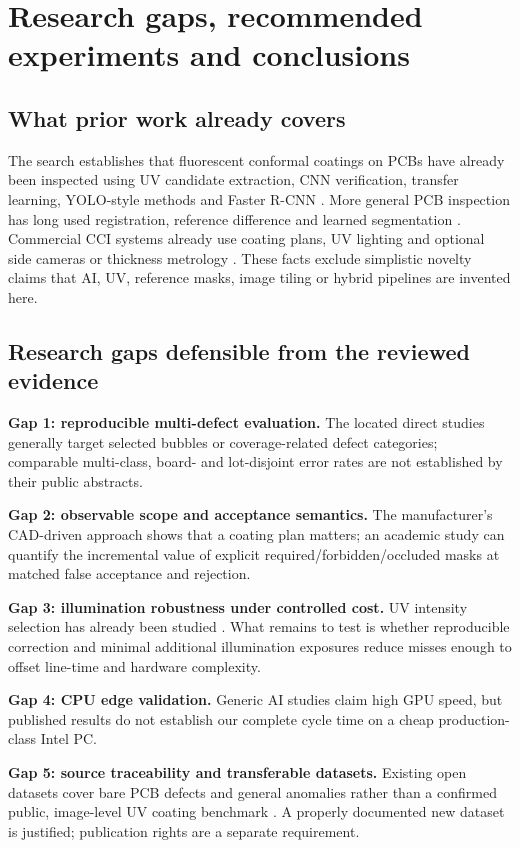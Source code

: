 \section{Research gaps, recommended experiments and conclusions}
\subsection{What prior work already covers}
The search establishes that fluorescent conformal coatings on PCBs have already been inspected using UV candidate extraction, CNN verification, transfer learning, YOLO-style methods and Faster R-CNN \citep{lee2021cnn,lee2021transfer,choi2024uv,wang2025bubble,patel2026coverage}. More general PCB inspection has long used registration, reference difference and learned segmentation \citep{hara1988fluorescent,qub2025registration,ebayyeh2020aoi}. Commercial CCI systems already use coating plans, UV lighting and optional side cameras or thickness metrology \citep{goepelcci,nordsoncci,mirteccci}. These facts exclude simplistic novelty claims that AI, UV, reference masks, image tiling or hybrid pipelines are invented here.

\subsection{Research gaps defensible from the reviewed evidence}
\textbf{Gap 1: reproducible multi-defect evaluation.} The located direct studies generally target selected bubbles or coverage-related defect categories; comparable multi-class, board- and lot-disjoint error rates are not established by their public abstracts.\par
\textbf{Gap 2: observable scope and acceptance semantics.} The manufacturer's CAD-driven approach shows that a coating plan matters; an academic study can quantify the incremental value of explicit required/forbidden/occluded masks at matched false acceptance and rejection.\par
\textbf{Gap 3: illumination robustness under controlled cost.} UV intensity selection has already been studied \citep{choi2024uv}. What remains to test is whether reproducible correction and minimal additional illumination exposures reduce misses enough to offset line-time and hardware complexity.\par
\textbf{Gap 4: CPU edge validation.} Generic AI studies claim high GPU speed, but published results do not establish our complete cycle time on a cheap production-class Intel PC.\par
\textbf{Gap 5: source traceability and transferable datasets.} Existing open datasets cover bare PCB defects and general anomalies rather than a confirmed public, image-level UV coating benchmark \citep{lv2024dspcb,bergmann2019mvtec,visa2022dataset}. A properly documented new dataset is justified; publication rights are a separate requirement.\par

